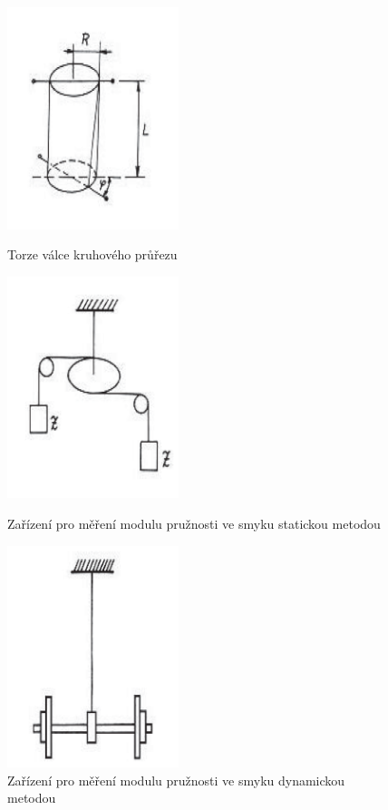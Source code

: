 \documentclass[english]{article}
\begin{document}
	\begin{figure}[h!]
	\centering
	\begin{minipage}{.30\textwidth}
	  \centering
					\includegraphics[width=5cm]{att/torze_valce.pdf}
					\vspace*{-0.5cm}
					\caption{Torze válce kruhového průřezu \cite{bib:zadani}}
					\label{fig:torze_valce}
	\end{minipage}%
	\hfill
	\begin{minipage}{.30\textwidth}
	  \centering
					\includegraphics[width=5cm]{att/torze_staticka.pdf}
					\vspace*{-0.5cm}
					\caption{Zařízení pro měření modulu pružnosti ve smyku statickou metodou \cite{bib:zadani}}
					\label{fig:torze_staticka}
	\end{minipage}
	\hfill
	\begin{minipage}{.30\textwidth}
	  \centering
					\includegraphics[width=5cm]{att/torze_dynamicka.pdf}
					\caption{Zařízení pro měření modulu pružnosti ve smyku dynamickou metodou \cite{bib:zadani}}
					\label{fig:torze_dynamicka}
	\end{minipage}
	\end{figure}
				
\clearpage
	
\end{document}
